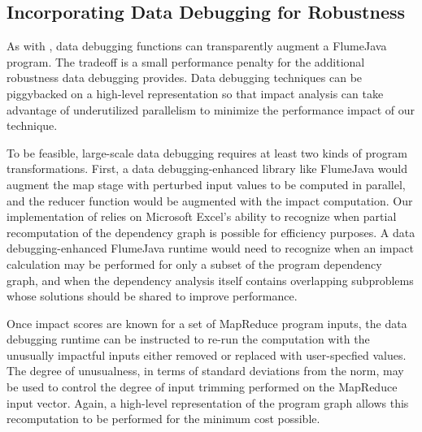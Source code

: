 \subsection*{Incorporating Data Debugging for Robustness}

As with \checkcell{}, data debugging functions can transparently
augment a FlumeJava program.  The tradeoff is a small performance
penalty for the additional robustness data debugging provides. Data
debugging techniques can be piggybacked on a high-level representation
so that impact analysis can take advantage of underutilized
parallelism to minimize the performance impact of our technique.

To be feasible, large-scale data debugging requires at least two kinds
of program transformations.  First, a data debugging-enhanced library
like FlumeJava would augment the map stage with perturbed input values
to be computed in parallel, and the reducer function would be
augmented with the impact computation.  Our implementation of
\checkcell{} relies on Microsoft Excel's ability to recognize when
partial recomputation of the dependency graph is possible for
efficiency purposes. A data debugging-enhanced FlumeJava runtime would
need to recognize when an impact calculation may be performed for
only a subset of the program dependency graph, and when the dependency
analysis itself contains overlapping subproblems whose solutions
should be shared to improve performance.

Once impact scores are known for a set of MapReduce program inputs,
the data debugging runtime can be instructed to re-run the computation
with the unusually impactful inputs either removed or replaced with
user-specfied values.  The degree of unusualness, in terms of standard
deviations from the norm, may be used to control the degree of
input trimming performed on the MapReduce input vector.  Again,
a high-level representation of the program graph allows this
recomputation to be performed for the minimum cost possible.
